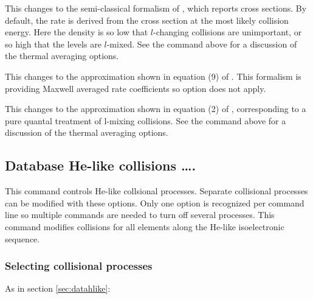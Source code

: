   This
changes to the semi-classical formalism  of \citet{Vrinceanu2001}, which reports cross sections.
By default, the rate is derived from the cross section at the most likely collision energy.
Here the density is so low that $l$-changing collisions are unimportant, or so high that the
levels are $l$-mixed. See the  
command above for a discussion of the thermal averaging options.


  This
changes to the approximation shown in equation (9) of \citet{VOS2012}. This formalism is providing Maxwell averaged rate coefficients so  option does not apply. 

  This
changes to the approximation shown in equation (2) of \citet{VOS2012}, 
corresponding to a pure quantal treatment of l-mixing collisions.
See the  
command above for a discussion of the thermal averaging options.

\subsection{Database He-like collisions \dots.}

This command controls He-like collsional processes. Separate collisional processes can be modified
with these options.
Only one option is recognized per command line
so multiple commands are needed to turn off several processes.
This command modifies collisions for all elements along the He-like
isoelectronic sequence.

\subsubsection{Selecting collisional processes}

As in section \ref{sec:datahlike}:



